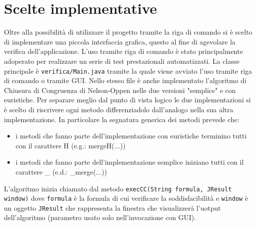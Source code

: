 \documentclass[a4paper,11pt]{article}
\begin{document}
\section{Scelte implementative}
Oltre alla possibilità di utilizzare il progetto tramite la riga di comando si è scelto di implementare una piccola interfaccia grafica, questo al fine di agevolare la verifica dell'applicazione.
L'uso tramite riga di comando è stato principalmente adoperato per realizzare un serie di test prestazionali automatizzati.
La classe principale è {\tt verifica/Main.java} tramite la quale viene avviato l'uso tramite riga di comando o tramite GUI.
Nello stesso file è anche implementato l'algoritmo di Chiusura di Congruenza di Nelson-Oppen nelle due versioni "semplice" e con euristiche.
Per separare meglio dal punto di vista logico le due implementazioni si è scelto di riscrivere ogni metodo differenziadolo dall'analogo nella sua altra implementazione.
In particolare la segnatura generica dei metodi prevede che:
\begin{itemize}
	\item i metodi che fanno parte dell'implementazione con euristiche terminino tutti con il carattere H (e.g.: mergeH(...))
	\item i metodi che fanno parte dell'implementazione semplice iniziano tutti con il carattere \_ (e.d.: \_merge(...))
\end{itemize}
L'algoritmo inizia chiamato dal metodo 
{\tt execCC(String formula, JResult window)}
dove {\tt formula} è la formula di cui verificare la soddisfacibilità e {\tt window} è un oggetto {\tt JResult} che rappresenta la finestra che visualizzerà l'uotput dell'algoritmo (parametro usato solo nell'invocazione con GUI).
\end{document}
